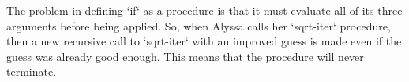 The problem in defining `if` as a procedure is that it must evaluate all of its three arguments before being applied.
So, when Alyssa calls her `sqrt-iter` procedure, then a new recursive call to `sqrt-iter` with an improved guess is made even if the guess was already good enough.  This means that the procedure will never terminate.
